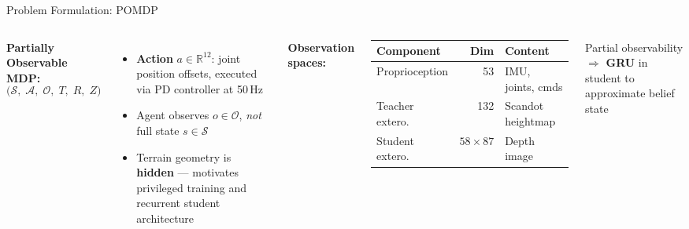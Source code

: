 \documentclass[aspectratio=169,10pt]{beamer}
\begin{document}
\begin{frame}{Problem Formulation: POMDP}
\begin{columns}[T]
  \textbf{Partially Observable MDP:}
  \[
    \bigl(\mathcal{S},\;\mathcal{A},\;\mathcal{O},\;T,\;R,\;Z\bigr)
  \]
  \begin{itemize}
    \setlength\itemsep{0.5em}
    \item \textbf{Action} $a \in \mathbb{R}^{12}$: joint position offsets,
          executed via PD controller at 50\,Hz
    \item Agent observes $o\!\in\!\mathcal{O}$, \emph{not} full state $s\!\in\!\mathcal{S}$
    \item Terrain geometry is \textbf{hidden} --- motivates privileged training and
          recurrent student architecture
  \end{itemize}

  \vspace{0.3em}
  \textbf{Observation spaces:}\\[0.5em]
  {\small
  \begin{tabular}{@{}lrl@{}}
    \toprule
    Component & Dim & Content \\
    \midrule
    Proprioception & 53 & IMU, joints, cmds \\
    Teacher extero. & 132 & Scandot heightmap \\
    Student extero. & $58{\times}87$ & Depth image \\
    \bottomrule
  \end{tabular}
  }
  \vspace{0.8em}

  Partial observability $\Rightarrow$ \textbf{GRU} in student
  to approximate belief state
\end{columns}
\end{frame}


\end{document}
